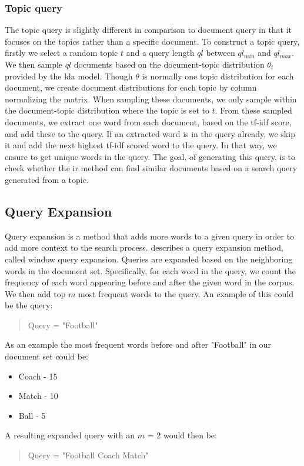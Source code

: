 \subsubsection{Topic query}\label{subsec:query_gen_top}
The topic query is slightly different in comparison to document query in that it focuses on the topics rather than a specific document.
To construct a topic query, firstly we select a random topic $t$ and a query length $ql$ between $ql_{min}$ and $ql_{max}$.
We then sample $ql$ documents based on the document-topic distribution $\theta_t$ provided by the \gls{lda} model.
Though $\theta$ is normally one topic distribution for each document, we create document distributions for each topic by column normalizing the matrix.
When sampling these documents, we only sample within the document-topic distribution where the topic is set to $t$.
From these sampled documents, we extract one word from each document, based on the \gls{tf-idf} score, and add these to the query.
If an extracted word is in the query already, we skip it and add the next highest \gls{tf-idf} scored word to the query.
In that way, we ensure to get unique words in the query.
The goal, of generating this query, is to check whether the \gls{ir} method can find similar documents based on a search query generated from a topic.

\subsection{Query Expansion}\label{subsec:query_expansion}
Query expansion is a method that adds more words to a given query in order to add more context to the search process.
\citet{yang2009topic} describes a query expansion method, called window query expansion.
Queries are expanded based on the neighboring words in the document set.
Specifically, for each word in the query, we count the frequency of each word appearing before and after the given word in the corpus.
We then add top $m$ most frequent words to the query.
An example of this could be the query: 
\begin{quote}
	Query = "Football"
\end{quote}
As an example the most frequent words before and after "Football" in our document set could be:
\begin{itemize}
	\item Coach - 15
	\item Match - 10
	\item Ball - 5
\end{itemize}
A resulting expanded query with an $m$ = 2 would then be:
\begin{quote}
	Query = "Football Coach Match"
\end{quote}



